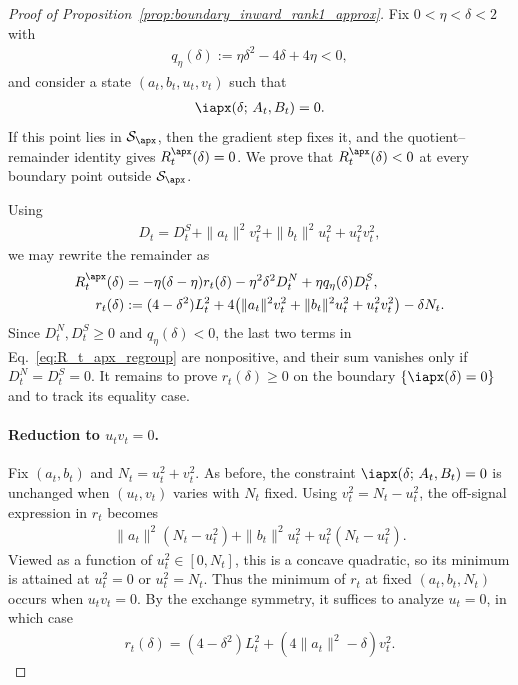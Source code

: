 \documentclass{article}
\begin{document}
\begin{proof}[Proof of Proposition~\ref{prop:boundary_inward_rank1_approx}]
Fix $0<\eta<\delta<2$ with
\begin{align}
    q_\eta(\delta):=\eta\delta^2-4\delta+4\eta<0,
\end{align}
and consider a state $(a_t,b_t,u_t,v_t)$ such that
\begin{align*}
    \iapx(\delta;\,A_t,B_t)=0.
\end{align*}
If this point lies in $\mathcal S_\apx$, then the gradient step fixes it, and the
quotient--remainder identity gives $R_t^\apx(\delta)=0$. We prove that
$R_t^\apx(\delta)<0$ at every boundary point outside $\mathcal S_\apx$.

Using
\begin{align}
    D_t
    =D_t^S+\|a_t\|^2v_t^2+\|b_t\|^2u_t^2+u_t^2v_t^2,
\end{align}
we may rewrite the remainder as
\begin{align}
    R_t^\apx(\delta)
    &=-\eta(\delta-\eta)r_t(\delta)
      -\eta^2\delta^2D_t^N
      +\eta q_\eta(\delta)D_t^S,
      \label{eq:R_t_apx_regroup}\\
    r_t(\delta)
    &:=(4-\delta^2)L_t^2
      +4\bigl(\|a_t\|^2v_t^2+\|b_t\|^2u_t^2+u_t^2v_t^2\bigr)
      -\delta N_t.
      \label{eq:r_t_apx_regroup}
\end{align}
Since $D_t^N,D_t^S\ge0$ and $q_\eta(\delta)<0$, the last two terms in
Eq.~\eqref{eq:R_t_apx_regroup} are nonpositive, and their sum vanishes only if
$D_t^N=D_t^S=0$. It remains to prove $r_t(\delta)\ge0$ on
the boundary $\{\iapx(\delta)=0\}$ and to track its equality case.

\paragraph{Reduction to $u_tv_t=0$.}
Fix $(a_t,b_t)$ and $N_t=u_t^2+v_t^2$. As before, the constraint
$\iapx(\delta;\,A_t,B_t)=0$ is unchanged when $(u_t,v_t)$ varies with
$N_t$ fixed. Using
$v_t^2=N_t-u_t^2$, the off-signal expression in $r_t$ becomes
\begin{align}
    \|a_t\|^2(N_t-u_t^2)
    +\|b_t\|^2u_t^2
    +u_t^2(N_t-u_t^2).
\end{align}
Viewed as a function of $u_t^2\in[0,N_t]$, this is a concave quadratic, so its
minimum is attained at $u_t^2=0$ or $u_t^2=N_t$. Thus the minimum of $r_t$ at
fixed $(a_t,b_t,N_t)$ occurs when $u_tv_t=0$. By the exchange symmetry, it
suffices to analyze $u_t=0$, in which case
\begin{align}
    r_t(\delta)
    =(4-\delta^2)L_t^2+(4\|a_t\|^2-\delta)v_t^2.
    \label{eq:r_reduced_apx}
\end{align}


\end{proof}
\end{document}
